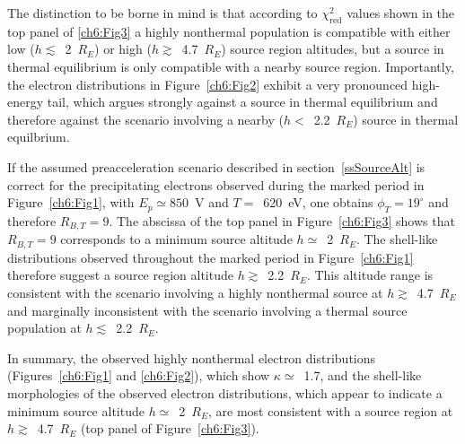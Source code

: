   The distinction to be borne in mind is that according to
  $\chi^2_{\mathrm{red}}$ values shown in the top panel of \ref{ch6:Fig3} a
  highly nonthermal population is compatible with either low
  ($h \lesssim$~2~$R_E$) or high ($h \gtrsim$~4.7~$R_E$) source region
  altitudes, but a source in thermal equilibrium is only compatible with a
  nearby source region. Importantly, the electron distributions in
  Figure~\ref{ch6:Fig2} exhibit a very pronounced high-energy tail, which argues
  strongly against a source in thermal equilibrium and therefore against the
  scenario involving a nearby ($h <$~2.2~$R_E$) source in thermal equilbrium.

  If the assumed preacceleration scenario described in section~\ref{ssSourceAlt}
  is correct for the precipitating electrons observed during the marked period
  in Figure~\ref{ch6:Fig1}, with $E_p \simeq 850$~V and $T =$~620~eV, one
  obtains $\phi_T = 19^\circ$ and therefore $R_{B,T} = 9$. The abscissa of the
  top panel in Figure~\ref{ch6:Fig3} shows that $R_{B,T} = 9$ corresponds to a
  minimum source altitude $h \simeq$~2~$R_E$. The shell-like distributions
  observed throughout the marked period in Figure~\ref{ch6:Fig1} therefore
  suggest a source region altitude $h \gtrsim$~2.2~$R_E$. This altitude range is
  consistent with the scenario involving a highly nonthermal source at
  $h \gtrsim$~4.7~$R_E$ and marginally inconsistent with the scenario involving
  a thermal source population at $h \lesssim$~2.2~$R_E$.

  In summary, the observed highly nonthermal electron distributions
  (Figures~\ref{ch6:Fig1} and \ref{ch6:Fig2}), which show $\kappa \simeq$~1.7,
  and the shell-like morphologies of the observed electron distributions, which
  appear to indicate a minimum source altitude $h \simeq$~2~$R_E$, are most
  consistent with a source region at $h \gtrsim$~4.7~$R_E$ (top panel of
  Figure~\ref{ch6:Fig3}).





  
